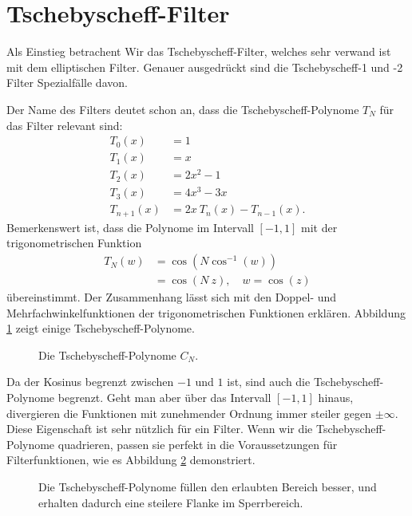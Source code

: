 \section{Tschebyscheff-Filter}

Als Einstieg betrachent Wir das Tschebyscheff-Filter, welches sehr verwand ist mit dem elliptischen Filter.
Genauer ausgedrückt sind die Tschebyscheff-1 und -2 Filter Spezialfälle davon.

Der Name des Filters deutet schon an, dass die Tschebyscheff-Polynome $T_N$ für das Filter relevant sind:
\begin{align}
    T_{0}(x)&=1\\
    T_{1}(x)&=x\\
    T_{2}(x)&=2x^{2}-1\\
    T_{3}(x)&=4x^{3}-3x\\
    T_{n+1}(x)&=2x~T_{n}(x)-T_{n-1}(x).
\end{align}
Bemerkenswert ist, dass die Polynome im Intervall $[-1, 1]$ mit der trigonometrischen Funktion
\begin{align} \label{ellfilter:eq:chebychef_polynomials}
    T_N(w) &= \cos \left( N \cos^{-1}(w) \right) \\
           &= \cos \left(N~z \right), \quad w= \cos(z)
\end{align}
übereinstimmt.
Der Zusammenhang lässt sich mit den Doppel- und Mehrfachwinkelfunktionen der trigonometrischen Funktionen erklären.
Abbildung \ref{ellfilter:fig:chebychef_polynomials} zeigt einige Tschebyscheff-Polynome.
\begin{figure}
    \centering
    
    \caption{Die Tschebyscheff-Polynome $C_N$.}
    \label{ellfilter:fig:chebychef_polynomials}
\end{figure}
Da der Kosinus begrenzt zwischen $-1$ und $1$ ist, sind auch die Tschebyscheff-Polynome begrenzt.
Geht man aber über das Intervall $[-1, 1]$ hinaus, divergieren die Funktionen mit zunehmender Ordnung immer steiler gegen $\pm \infty$.
Diese Eigenschaft ist sehr nützlich für ein Filter.
Wenn wir die Tschebyscheff-Polynome quadrieren, passen sie perfekt in die Voraussetzungen für Filterfunktionen, wie es Abbildung \ref{ellfiter:fig:chebychef} demonstriert.
\begin{figure}
    \centering
    
    \caption{Die Tschebyscheff-Polynome füllen den erlaubten Bereich besser, und erhalten dadurch eine steilere Flanke im Sperrbereich.}
    \label{ellfiter:fig:chebychef}
\end{figure}


